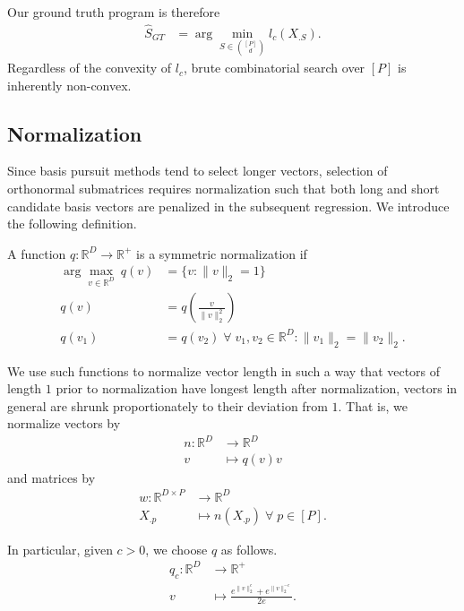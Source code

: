 Our ground truth program is therefore 
\begin{align}
\label{prog:ground_truth}
\widehat { S}_{GT}  &= \arg \min_{ S \in \binom{[P]}{d}} l_c ( X_{. S}).
\end{align}
Regardless of the convexity of $l_c$, brute combinatorial search over $[P]$ is inherently non-convex.

\subsection{Normalization}
\label{sec:normalization}

Since basis pursuit methods tend to select longer vectors, selection of orthonormal submatrices requires normalization such that both long and short candidate basis vectors are penalized in the subsequent regression.
We introduce the following definition.

\begin{definition}
A function $q: \mathbb R^D \to \mathbb R^+ $ is a symmetric normalization if 
\begin{align}
\arg \max_{v \in \mathbb R^D} \ q (v) &=\{ v : \|v\|_2 = 1 \} \\
q(v) &= q(\frac{v}{\|v\|_2^2}) \\
q(v_1) &= q(v_2) \; \forall \; v_1, v_2 \in \mathbb R^D : \|v_1\|_2 = \|v_2\|_2.
\end{align} \label{def:symmetric_normalization}
\end{definition}

We use such functions to normalize vector length in such a way that vectors of length $1$ prior to normalization have longest length after normalization, vectors in general are shrunk proportionately to their deviation from $1$. 
That is, we normalize vectors by 
\begin{align}
n: \mathbb R^D  &\to \mathbb R^D \\
v &\mapsto {q(v) }v
\end{align}
and matrices by
\begin{align}
w: \mathbb R^{D \times P}  &\to \mathbb R^D \\
 X_{.p} &\mapsto n( X_{.p}) \; \forall \; p \in [P].
\end{align}

In particular, given $c > 0$, we choose $q$ as follows.
\begin{align}
\label{eq:normalization}
q_c: \mathbb R^D  &\to \mathbb R^+ \\
v  &\mapsto \frac{e^{\|v\|_2^c} + e^{\|v\|_2^{-c}}}{2e}.
\end{align}

